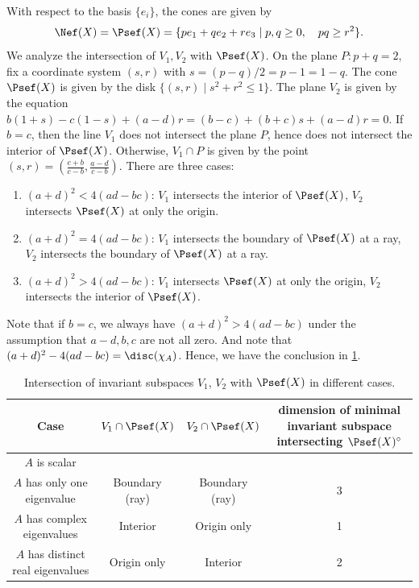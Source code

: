     With respect to the basis \(\{e_i\}\), the cones are given by
    \[ \Nef(X) = \Psef(X) = \{p e_1 + q e_2 + r e_3 \mid p,q \geq 0, \quad pq \geq r^2\}. \]
    We analyze the intersection of \(V_1, V_2\) with \(\Psef(X)\).
    On the plane \(P: p+q = 2\), fix a coordinate system \((s,r)\) with \(s = (p-q)/2 = p-1 = 1-q\).
    The cone \(\Psef(X)\) is given by the disk \(\{ (s,r) \mid s^2 + r^2 \leq 1\}\).
    The plane \(V_2\) is given by the equation \(b(1+s) - c(1-s) + (a-d)r = (b-c) + (b+c)s + (a-d)r = 0\).
    If \(b=c\), then the line \(V_1\) does not intersect the plane \(P\), hence does not intersect the interior of \(\Psef(X)\).
    Otherwise, \(V_1 \cap P\) is given by the point \((s,r) = \left(\frac{c+b}{c-b}, \frac{a-d}{c-b}\right)\).
    There are three cases:
    \begin{enumerate}
        \item \((a+d)^2 < 4(ad-bc)\): \(V_1\) intersects the interior of \(\Psef(X)\), \(V_2\) intersects \(\Psef(X)\) at only the origin.
        \item \((a+d)^2 = 4(ad-bc)\): \(V_1\) intersects the boundary of \(\Psef(X)\) at a ray, \(V_2\) intersects the boundary of \(\Psef(X)\) at a ray.
        \item \((a+d)^2 > 4(ad-bc)\): \(V_1\) intersects \(\Psef(X)\) at only the origin, \(V_2\) intersects the interior of \(\Psef(X)\).
    \end{enumerate}
    Note that if \(b=c\), we always have \((a+d)^2 > 4(ad-bc)\) under the assumption that \(a-d,b,c\) are not all zero.
    And note that \((a+d)^2 - 4(ad-bc) = \disc(\chi_A)\).
    Hence, we have the conclusion in \cref{table:intersection_of_invariant_subspaces_with_psef_cone_on_product_of_elliptic_curves:abelian-varieties}.
    \begin{table}[!ht]
        \centering
        \begin{tabular}{|c|c|c|c|}
            \hline
            Case & $V_1 \cap \Psef(X)$ & $V_2 \cap \Psef(X)$ & \makecell[c]{dimension of minimal \\ invariant subspace \\ intersecting \(\Psef(X)^\circ\)} \\
            \hline
            \(A\) is scalar &  &  &  \\
            \(A\) has only one eigenvalue  & Boundary (ray) & Boundary (ray) & 3 \\
            \(A\) has complex eigenvalues & Interior & Origin only & 1 \\
            \(A\) has distinct real eigenvalues & Origin only & Interior & 2 \\
            \hline
        \end{tabular}
        \caption{Intersection of invariant subspaces $V_1$, $V_2$ with $\Psef(X)$ in different cases.}
        \label{table:intersection_of_invariant_subspaces_with_psef_cone_on_product_of_elliptic_curves:abelian-varieties}
    \end{table}

